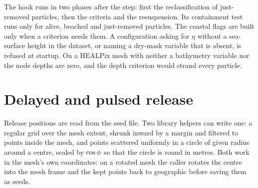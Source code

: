 The hook runs in two phases after the step: first the reclassification of just-removed particles, then the
criteria and the resuspension. Its containment test runs only for alive, beached and just-removed particles. The
coastal flags are built only when a criterion needs them. A configuration asking for $\eta$ without a
sea-surface height in the dataset, or naming a dry-mask variable that is absent, is refused at startup. On a
HEALPix mesh with neither a bathymetry variable nor  the node depths are zero, and the depth criterion would strand every particle.

\section{Delayed and pulsed release}\label{sec:life-release}

Release positions are read from the seed file. Two library helpers can write one: a regular grid over the
mesh extent, shrunk inward by a margin and filtered to points inside the mesh, and points scattered uniformly
in a circle of given radius around a centre, scaled by $\cos\phi$ so that the circle is round in metres.
Both work in the mesh's own coordinates: on a rotated mesh the caller rotates the centre into the mesh
frame and the kept points back to geographic before saving them as seeds.

